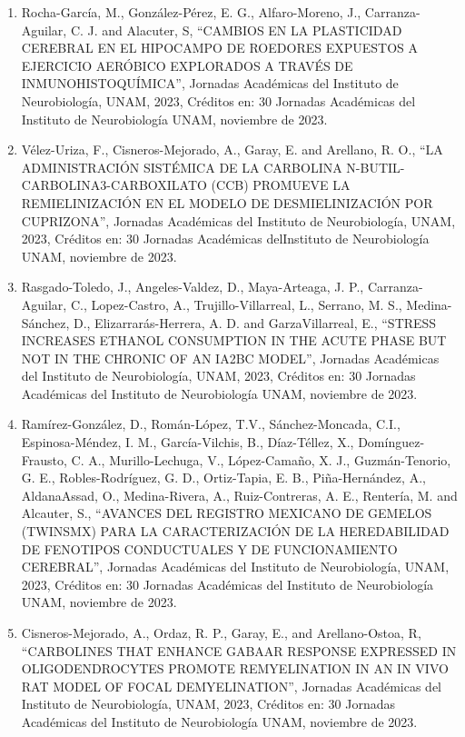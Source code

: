 \begin{enumerate}
\item Rocha-García, M., González-Pérez, E. G., Alfaro-Moreno, J., Carranza-Aguilar, C. J. and Alacuter, S, “CAMBIOS EN LA PLASTICIDAD 
CEREBRAL EN 
EL HIPOCAMPO DE ROEDORES EXPUESTOS A EJERCICIO AERÓBICO EXPLORADOS A TRAVÉS DE INMUNOHISTOQUÍMICA”, Jornadas Académicas del Instituto de 
Neurobiología, UNAM, 2023, Créditos en: 30 Jornadas Académicas del Instituto de Neurobiología UNAM, noviembre de 2023.

\item Vélez-Uriza, F., Cisneros-Mejorado, A., Garay, E. and Arellano, R. O., “LA ADMINISTRACIÓN SISTÉMICA DE LA CARBOLINA 
N-BUTIL-CARBOLINA3-CARBOXILATO (CCB) PROMUEVE LA REMIELINIZACIÓN EN EL MODELO DE DESMIELINIZACIÓN POR CUPRIZONA”, Jornadas Académicas del 
Instituto de 
Neurobiología, UNAM, 2023, Créditos en: 30 Jornadas Académicas delInstituto de Neurobiología UNAM, noviembre de 2023.

\item Rasgado-Toledo, J., Angeles-Valdez, D., Maya-Arteaga, J. P., Carranza-Aguilar, C., Lopez-Castro, A., Trujillo-Villarreal, L., Serrano, 
M. S., 
Medina-Sánchez, D., Elizarrarás-Herrera, A. D. and GarzaVillarreal, E., “STRESS INCREASES ETHANOL CONSUMPTION IN THE ACUTE PHASE BUT NOT IN 
THE CHRONIC OF AN IA2BC MODEL”, Jornadas Académicas del Instituto de Neurobiología, UNAM, 2023, Créditos en: 30 Jornadas Académicas del 
Instituto de Neurobiología UNAM, noviembre de 2023.

\item Ramírez-González, D., Román-López, T.V., Sánchez-Moncada, C.I., Espinosa-Méndez, I. M., García-Vilchis, B., Díaz-Téllez, X., 
Domínguez-Frausto, C. A., Murillo-Lechuga, V., López-Camaño, X. J., Guzmán-Tenorio, G. E., Robles-Rodríguez, G. D., Ortiz-Tapia, E. B., 
Piña-Hernández, A., AldanaAssad, O., Medina-Rivera, A., Ruiz-Contreras, A. E., Rentería, M. and Alcauter, S., “AVANCES DEL REGISTRO MEXICANO 
DE GEMELOS (TWINSMX) PARA LA CARACTERIZACIÓN DE LA HEREDABILIDAD DE FENOTIPOS CONDUCTUALES Y DE FUNCIONAMIENTO CEREBRAL”, Jornadas Académicas 
del Instituto de Neurobiología, UNAM, 2023, Créditos en: 30 Jornadas Académicas del Instituto de Neurobiología UNAM, noviembre de 2023.

\item Cisneros-Mejorado, A., Ordaz, R. P., Garay, E., and Arellano-Ostoa, R, “CARBOLINES THAT ENHANCE GABAAR RESPONSE EXPRESSED IN 
OLIGODENDROCYTES PROMOTE REMYELINATION IN AN IN VIVO RAT MODEL OF FOCAL DEMYELINATION”, Jornadas Académicas del Instituto de Neurobiología, 
UNAM, 2023, Créditos en: 30 Jornadas Académicas del Instituto de Neurobiología UNAM, noviembre de 2023.


\end{enumerate}
